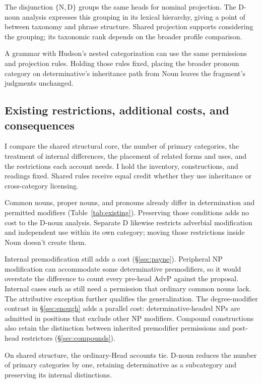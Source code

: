 \documentclass[12pt]{article}
\begin{document}
The disjunction $\{\mathrm{N},\mathrm{D}\}$ groups the same heads for nominal projection. The D-noun analysis expresses this grouping in its lexical hierarchy, giving a point of  between taxonomy and phrase structure. Shared projection supports considering the grouping; its taxonomic rank depends on the broader profile comparison.

A grammar with Hudson's nested categorization can use the same permissions and projection rules. Holding those rules fixed, placing the broader pronoun category on determinative's inheritance path from Noun leaves the fragment's judgments unchanged.

\subsection{Existing restrictions, additional costs, and consequences}\label{sec:costs}

I compare the shared structural core, the number of primary categories, the treatment of internal differences, the placement of related forms and uses, and the restrictions each account needs. I hold the inventory, constructions, and readings fixed. Shared rules receive equal credit whether they use inheritance or cross-category licensing.

Common nouns, proper nouns, and pronouns already differ in determination and permitted modifiers (Table~\ref{tab:existing}). Preserving those conditions adds no cost to the D-noun analysis. Separate D likewise restricts adverbial modification and independent use within its own category; moving those restrictions inside Noun doesn't create them.

Internal premodification still adds a cost (§\ref{sec:payne}). Peripheral NP modification can accommodate some determinative premodifiers, so it would overstate the difference to count every pre-head AdvP against the proposal. Internal cases such as  still need a permission that ordinary common nouns lack. The attributive  exception further qualifies the generalization. The degree-modifier contrast in §\ref{sec:enough} adds a parallel cost: determinative-headed NPs are admitted in positions that exclude other NP modifiers. Compound constructions also retain the distinction between inherited premodifier permissions and post-head restrictors (§\ref{sec:compounds}).

On shared structure, the ordinary-Head accounts tie. D-noun reduces the number of primary categories by one, retaining determinative as a subcategory and preserving its internal distinctions.
\end{document}

